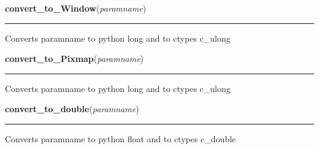     \label{xformslib:library:convert_to_ulong}

    \vspace{0.5ex}

\hspace{.8\funcindent}\begin{boxedminipage}{\funcwidth}

    \raggedright \textbf{convert\_to\_Window}(\textit{paramname})

    \vspace{-1.5ex}

    \rule{\textwidth}{0.5\fboxrule}
\setlength{\parskip}{2ex}
    Converts paramname to python long and to ctypes c\_ulong

\setlength{\parskip}{1ex}
    \end{boxedminipage}

    \label{xformslib:library:convert_to_ulong}

    \vspace{0.5ex}

\hspace{.8\funcindent}\begin{boxedminipage}{\funcwidth}

    \raggedright \textbf{convert\_to\_Pixmap}(\textit{paramname})

    \vspace{-1.5ex}

    \rule{\textwidth}{0.5\fboxrule}
\setlength{\parskip}{2ex}
    Converts paramname to python long and to ctypes c\_ulong

\setlength{\parskip}{1ex}
    \end{boxedminipage}

    \label{xformslib:library:convert_to_double}

    \vspace{0.5ex}

\hspace{.8\funcindent}\begin{boxedminipage}{\funcwidth}

    \raggedright \textbf{convert\_to\_double}(\textit{paramname})

    \vspace{-1.5ex}

    \rule{\textwidth}{0.5\fboxrule}
\setlength{\parskip}{2ex}
    Converts paramname to python float and to ctypes c\_double

\setlength{\parskip}{1ex}
    \end{boxedminipage}

